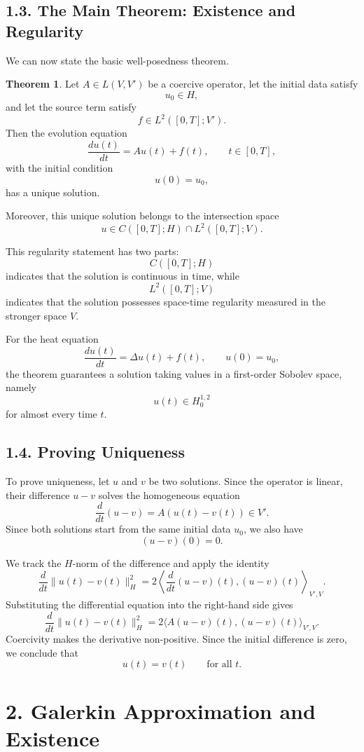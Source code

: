 \documentclass[11pt]{article}
\theoremstyle{definition}
\newtheorem{theorem}{Theorem}
\theoremstyle{remark}
\begin{document}
\subsection*{1.3. The Main Theorem: Existence and Regularity}
We can now state the basic well-posedness theorem.

\begin{theorem}
Let \(A\in L(V,V')\) be a coercive operator, let the initial data satisfy
\[
u_0\in H,
\]
and let the source term satisfy
\[
f\in L^2([0,T];V').
\]
Then the evolution equation
\[
\frac{du(t)}{dt}=Au(t)+f(t),
\qquad
t\in[0,T],
\]
with the initial condition
\[
u(0)=u_0,
\]
has a unique solution.

Moreover, this unique solution belongs to the intersection space
\[
u\in C([0,T];H)\cap L^2([0,T];V).
\]
\end{theorem}

This regularity statement has two parts:
\[
C([0,T];H)
\]
indicates that the solution is continuous in time, while
\[
L^2([0,T];V)
\]
indicates that the solution possesses space-time regularity measured in the stronger space \(V\).

For the heat equation
\[
\frac{du(t)}{dt}=\Delta u(t)+f(t),
\qquad
u(0)=u_0,
\]
the theorem guarantees a solution taking values in a first-order Sobolev space, namely
\[
u(t)\in H_0^{1,2}
\]
for almost every time \(t\).

\subsection*{1.4. Proving Uniqueness}
To prove uniqueness, let \(u\) and \(v\) be two solutions. Since the operator is linear, their difference \(u-v\) solves the homogeneous equation
\[
\frac{d}{dt}(u-v)=A(u(t)-v(t))\in V'.
\]
Since both solutions start from the same initial data \(u_0\), we also have
\[
(u-v)(0)=0.
\]

We track the \(H\)-norm of the difference and apply the identity
\[
\frac{d}{dt}\|u(t)-v(t)\|_H^2
=
2\left\langle \frac{d}{dt}(u-v)(t),(u-v)(t)\right\rangle_{V',V}.
\]
Substituting the differential equation into the right-hand side gives
\[
\frac{d}{dt}\|u(t)-v(t)\|_H^2
=
2\langle A(u-v)(t),(u-v)(t)\rangle_{V',V}.
\]
Coercivity makes the derivative non-positive. Since the initial difference is zero, we conclude that
\[
u(t)=v(t)
\qquad
\text{for all } t.
\]

\section*{2. Galerkin Approximation and Existence}
\end{document}
